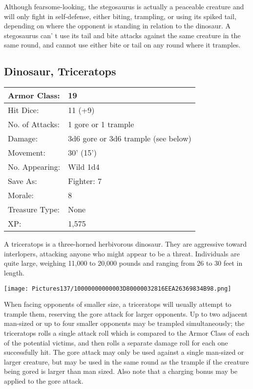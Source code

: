 \documentclass[a4paper,twoside,openany,10pt]{book}
\begin{document}
\begin{multicols}{2}
Although fearsome-looking, the stegosaurus is actually a peaceable creature and will only fight in self-defense, either biting, trampling, or using its spiked tail, depending on where the opponent is standing in relation to the dinosaur. A stegosaurus can' t use its tail and bite attacks against the same creature in the same round, and cannot use either bite or tail on any round where it tramples.

\subsection*{Dinosaur, Triceratops}\label{dinosaur-triceratops}

\begin{tabularx}{0.48\textwidth}{@{}lX@{}}
Armor Class: & 19 \\\hline
Hit Dice: & 11 (+9) \\\hline
No. of Attacks: & 1 gore or 1 trample \\\hline
Damage: & 3d6 gore or 3d6 trample (see below) \\\hline
Movement: & 30' (15') \\\hline
No. Appearing: & Wild 1d4 \\\hline
Save As: & Fighter: 7 \\\hline
Morale: & 8 \\\hline
Treasure Type: & None \\\hline
XP: & 1,575 \\\hline
\end{tabularx}\medskip

A triceratops is a three-horned herbivorous dinosaur. They are aggressive toward interlopers, attacking anyone who might appear to be a threat. Individuals are quite large, weighing 11,000 to 20,000 pounds and ranging from 26 to 30 feet in length.


\begin{center}
	\texttt{[image: Pictures137/10000000000003D80000032816EEA26369834B98.png]}
\end{center}

When facing opponents of smaller size, a triceratops will usually attempt to trample them, reserving the gore attack for larger opponents. Up to two adjacent man-sized or up to four smaller opponents may be trampled simultaneously; the triceratops rolls a single attack roll which is compared to the Armor Class of each of the potential victims, and then rolls a separate damage roll for each one successfully hit. The gore attack may only be used against a single man-sized or larger creature, but may be used in the same round as the trample if the creature being gored is larger than man sized. Also note that a charging bonus may be applied to the gore attack.



\end{multicols}
\end{document}
